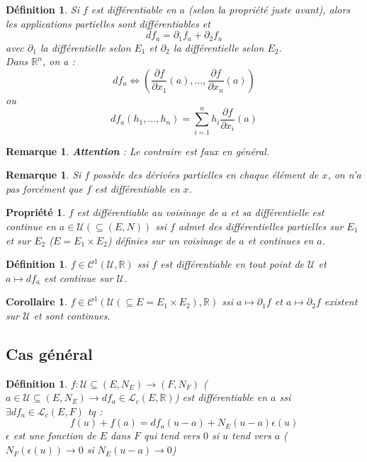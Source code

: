 \documentclass[a4paper, oneside]{report}
\theoremstyle{break}
\newtheorem{defi}[thm]{Définition}
\newtheorem{propr}[thm]{Propriété}
\newtheorem{cor}[thm]{Corollaire}
\newtheorem{remar}[thm]{Remarque}
\newcommand{\x}{\times}
\newcommand{\R}{\mathbb{R}}
\newcommand{\U}{\mathcal{U}}
\renewcommand{\L}{\mathcal{L}}
\begin{document}
\begin{defi}
Si $f$ est différentiable en $a$ (selon la propriété juste avant), alors les applications partielles sont différentiables et 
$$df_a= \partial_1f_a+\partial_2f_a$$
avec $\partial_1$ la différentielle selon $E_1$ et $\partial_2$ la différentielle selon $E_2$.\\
Dans $\R^n$, on a :
$$df_a\Leftrightarrow (\frac{\partial f}{\partial x_1}(a),...,\frac{\partial f}{\partial x_n}(a))$$
ou 
$$df_a(h_1,...,h_n)=\sum_{i=1}^n h_i \frac{\partial f}{\partial x_i}(a)$$
\end{defi}

\begin{remar}
\textbf{Attention} : Le contraire est faux en général.
\end{remar}

\begin{remar}
Si $f$ possède des dérivées partielles en chaque élément de $x$, on n'a pas forcément que $f$ est différentiable en $x$.
\end{remar}

\begin{propr}
$f$ est différentiable au voisinage de $a$ et sa différentielle est continue en $a\in \U (\subseteq (E,N))$ ssi $f$ admet des différentielles partielles sur $E_1$ et sur $E_2$ ($E=E_1\x E_2$) définies sur un voisinage de $a$ et continues en $a$.
\end{propr}

\begin{defi}
$f \in \mathcal{C}^1(\U, \R)$ ssi $f$ est différentiable en tout point de $\U$ et $a\mapsto df_a$ est continue sur $\U$.
\end{defi}

\begin{cor}
$f\in \mathcal{C}^1(\U(\subseteq E=E_1\x E_2),\R)$ ssi $a\mapsto \partial_1f$ et $a\mapsto \partial_2f$ existent sur $\U$ et sont continues.
\end{cor}

\subsection{Cas général}

\begin{defi}
$f : \U \subseteq (E,N_E) \rightarrow (F,N_F)$ ($a\in \U \subseteq (E,N_E) \rightarrow df_a\in \L_c(E,\R)$) est différentiable en $a$ ssi $\exists df_a \in \L_c(E,F)$ tq :
$$f(u)+f(a)=df_a(u-a)+N_E(u-a)\epsilon(u)$$
$\epsilon$ est une fonction de $E$ dans $F$ qui tend vers $0$ si $u$ tend vers $a$ ($N_F(\epsilon(u)) \rightarrow 0$ si $N_E(u-a)\rightarrow 0$)
\end{defi}
\end{document}
